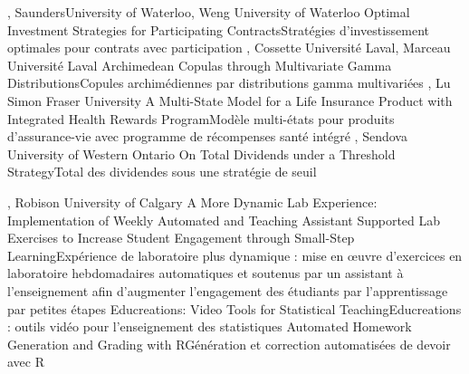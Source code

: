 %


{
,  {Saunders}{University of Waterloo},  {Weng}
{University of Waterloo}
}
{Optimal Investment Strategies for Participating Contracts}{Stratégies d’investissement optimales pour contrats avec participation}
{\bubbleE \enspace \screenE}
{
,  {Cossette}
{Université Laval},  {Marceau}
{Université Laval}
}
{Archimedean Copulas through Multivariate Gamma Distributions}{Copules archimédiennes par distributions gamma multivariées}
{\bubbleE \enspace \screenE}
{
,  {Lu}
{Simon Fraser University}
}
{A Multi-State Model for a Life Insurance Product with Integrated Health Rewards Program}{Modèle multi-états pour produits d’assurance-vie avec programme de récompenses santé intégré}
{\bubbleE \enspace \screenE}
{
,  {Sendova}
{University of Western Ontario}
}
{On Total Dividends under a Threshold Strategy}{Total des dividendes sous une stratégie de seuil}
{\bubbleE \enspace \screenE}


{
,  {Robison}
{University of Calgary}
}
{A More Dynamic Lab Experience: Implementation of Weekly Automated and Teaching Assistant Supported Lab Exercises to Increase Student Engagement through Small-Step Learning}{Expérience de laboratoire plus dynamique : mise en œuvre d’exercices en laboratoire hebdomadaires automatiques et soutenus par un assistant à l'enseignement afin d’augmenter l’engagement des étudiants par l’apprentissage par petites étapes}
{\bubbleE \enspace \screenE}
{
}
{Educreations: Video Tools for Statistical Teaching}{Educreations : outils vidéo pour l’enseignement des statistiques}
{\bubbleE \enspace \screenE}
{
}
{Automated Homework Generation and Grading with R}{Génération et correction automatisées de devoir avec R}
{\bubbleE \enspace \screenE}

